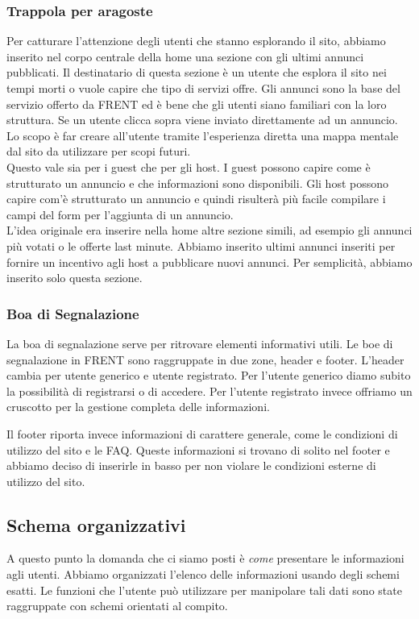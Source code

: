 \documentclass[1_relazione.tex]{subfiles}
\begin{document}
\subsubsection{Trappola per aragoste} 
Per catturare l'attenzione degli utenti che stanno esplorando il sito, abbiamo inserito nel corpo centrale della home una sezione con gli ultimi annunci pubblicati. Il destinatario di questa sezione è un utente che esplora il sito nei tempi morti o vuole capire che tipo di servizi offre. Gli annunci sono la base del servizio offerto da FRENT ed è bene che gli utenti siano familiari con la loro struttura. Se un utente clicca sopra viene inviato direttamente ad un annuncio. Lo scopo è far creare all'utente tramite l'esperienza diretta una mappa mentale dal sito da utilizzare per scopi futuri. \\
Questo vale sia per i guest che per gli host. I guest possono capire come è strutturato un annuncio e che informazioni sono disponibili. Gli host possono capire com'è strutturato un annuncio e quindi risulterà più facile compilare i campi del form per l'aggiunta di un annuncio. \\
L'idea originale era inserire nella home altre sezione simili, ad esempio gli annunci più votati o le offerte last minute. Abbiamo inserito ultimi annunci inseriti per fornire un incentivo agli host a pubblicare nuovi annunci. Per semplicità, abbiamo inserito solo questa sezione. \\

\subsubsection{Boa di Segnalazione}
La boa di segnalazione serve per ritrovare elementi informativi utili. Le boe di segnalazione in FRENT sono raggruppate in due zone, header e footer. 
L'header cambia per utente generico e utente registrato. Per l'utente generico diamo subito la possibilità di registrarsi o di accedere. Per l'utente registrato invece offriamo un cruscotto per la gestione completa delle informazioni. 

Il footer riporta invece informazioni di carattere generale, come le condizioni di utilizzo del sito e le FAQ. Queste informazioni si trovano di solito nel footer e abbiamo deciso di inserirle in basso per non violare le condizioni esterne di utilizzo del sito.  

\subsection{Schema organizzativi}
A questo punto la domanda che ci siamo posti è \textit{come} presentare le informazioni agli utenti. Abbiamo organizzati l'elenco delle informazioni usando degli schemi esatti. Le funzioni che l'utente può utilizzare per manipolare tali dati sono state raggruppate con schemi orientati al compito.
\end{document}
